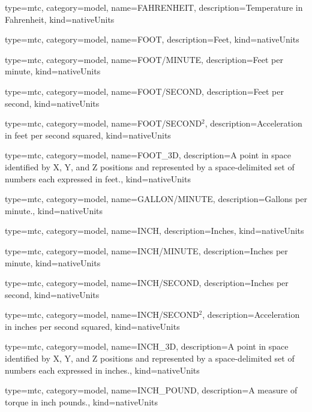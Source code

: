 {
  type=mtc,
  category=model,
  name={FAHRENHEIT},
  description={Temperature in Fahrenheit},
  kind={nativeUnits}
}


{
  type=mtc,
  category=model,
  name={FOOT},
  description={Feet},
  kind={nativeUnits}
}


{
  type=mtc,
  category=model,
  name={FOOT/MINUTE},
  description={Feet per minute},
  kind={nativeUnits}
}


{
  type=mtc,
  category=model,
  name={FOOT/SECOND},
  description={Feet per second},
  kind={nativeUnits}
}


{
  type=mtc,
  category=model,
  name={FOOT/SECOND$^2$},
  description={Acceleration in feet per second squared},
  kind={nativeUnits}
}


{
  type=mtc,
  category=model,
  name={FOOT\_3D},
  description={A point in space identified by X, Y, and Z positions and represented by a space-delimited set of numbers each expressed in feet.},
  kind={nativeUnits}
}


{
  type=mtc,
  category=model,
  name={GALLON/MINUTE},
  description={Gallons per minute.},
  kind={nativeUnits}
}


{
  type=mtc,
  category=model,
  name={INCH},
  description={Inches},
  kind={nativeUnits}
}


{
  type=mtc,
  category=model,
  name={INCH/MINUTE},
  description={Inches per minute},
  kind={nativeUnits}
}


{
  type=mtc,
  category=model,
  name={INCH/SECOND},
  description={Inches per second},
  kind={nativeUnits}
}


{
  type=mtc,
  category=model,
  name={INCH/SECOND$^2$},
  description={Acceleration in inches per second squared},
  kind={nativeUnits}
}


{
  type=mtc,
  category=model,
  name={INCH\_3D},
  description={A point in space identified by X, Y, and Z positions and represented by a space-delimited set of numbers each expressed in inches.},
  kind={nativeUnits}
}


{
  type=mtc,
  category=model,
  name={INCH\_POUND},
  description={A measure of torque in inch pounds.},
  kind={nativeUnits}
}


